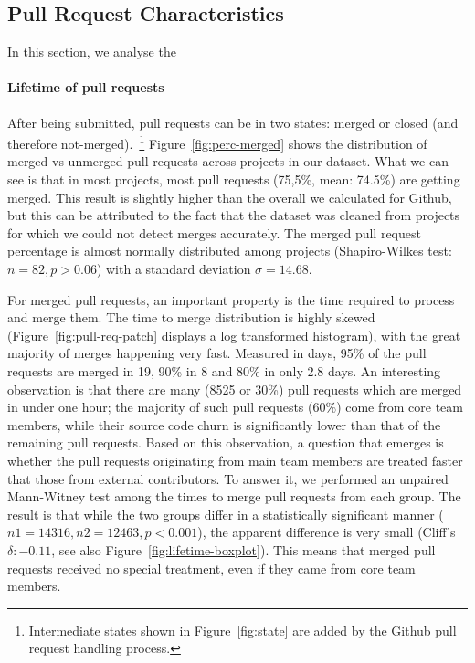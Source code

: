 \documentclass{sig-alternate}
\begin{document}
\subsection{Pull Request Characteristics}

In this section, we analyse the 

\paragraph*{Lifetime of pull requests}

After being submitted, pull requests can be in two states: merged or closed
(and therefore not-merged).~\footnote{Intermediate states shown in
Figure~\ref{fig:state} are added by the Github pull request handling process.} 
Figure~\ref{fig:perc-merged} shows the distribution of merged vs unmerged
pull requests across projects in our dataset. What we can see is that
in most projects, most pull requests (75,5\%, mean: 74.5\%) are getting
merged. This result is slightly higher than the overall we calculated for
Github, but this can be attributed to the fact that the dataset was cleaned
from projects for which we could not detect merges accurately. 
The merged pull request percentage is almost normally distributed among projects (Shapiro-Wilkes test: $n = 82, p > 0.06$) with a standard deviation $\sigma = 14.68$. 

For merged pull requests, an important property is the time required to process
and merge them. The time to merge distribution is highly skewed
(Figure~\ref{fig:pull-req-patch} displays a log transformed histogram), with
the great majority of merges happening very fast. Measured in days, 95\% of the
pull requests are merged in 19, 90\% in 8 and 80\% in only 2.8 days. An
interesting observation is that there are many (8525 or 30\%) pull requests
which are merged in under one hour; the majority of such pull requests (60\%)
come from core team members, while their source code churn is significantly
lower than that of the remaining pull requests.
Based on this observation, a question that emerges is whether the pull
requests originating from main team members are treated faster that those
from external contributors. To answer it, we performed an unpaired Mann-Witney
test among the times to merge pull requests from each group. The result
is that while the two groups differ in a statistically significant manner ($n1 = 14316, n2 = 12463, p < 0.001$), the apparent difference
is very small (Cliff's $\delta: -0.11$, see also Figure~\ref{fig:lifetime-boxplot}). This means that merged
pull requests received no special treatment, even if they came from core
team members.
\end{document}
